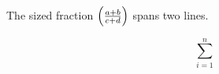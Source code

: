 %
%
%
%
\hsize=6.5in
\vsize=8.9in
\nopagenumbers
\noindent
The sized fraction $\left(a+b\over c+d\right)$ spans two lines.
\par
$$\sum_{i=1}^{n}$$
\bye

